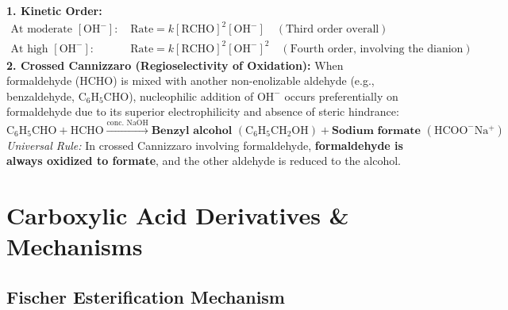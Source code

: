 \documentclass[10pt,a4paper]{article}
\begin{document}
\begin{formulabox}
\textbf{1. Kinetic Order:}
\begin{align*}
  \text{At moderate } [\mathrm{OH^-}]: \quad & \text{Rate} = k[\mathrm{RCHO}]^2[\mathrm{OH^-}] \quad (\text{Third order overall})\\
  \text{At high } [\mathrm{OH^-}]: \quad & \text{Rate} = k[\mathrm{RCHO}]^2[\mathrm{OH^-}]^2 \quad (\text{Fourth order, involving the dianion})
\end{align*}
\textbf{2. Crossed Cannizzaro (Regioselectivity of Oxidation):}
When formaldehyde ($\mathrm{HCHO}$) is mixed with another non-enolizable aldehyde (e.g., benzaldehyde, $\mathrm{C_6H_5CHO}$), nucleophilic addition of $\mathrm{OH^-}$ occurs preferentially on formaldehyde due to its superior electrophilicity and absence of steric hindrance:
\begin{equation}
  \mathrm{C_6H_5CHO} + \mathrm{HCHO} \xrightarrow{\text{conc. } \mathrm{NaOH}} \textbf{Benzyl alcohol } (\mathrm{C_6H_5CH_2OH}) + \textbf{Sodium formate } (\mathrm{HCOO^-Na^+})
\end{equation}
\textit{Universal Rule:} In crossed Cannizzaro involving formaldehyde, \textbf{formaldehyde is always oxidized to formate}, and the other aldehyde is reduced to the alcohol.
\end{formulabox}

\newpage
\section{Carboxylic Acid Derivatives \& Mechanisms}

\subsection{Fischer Esterification Mechanism}
\end{document}
